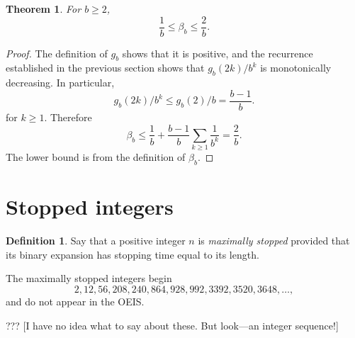 \documentclass[12pt]{amsart}
\newtheorem{theorem}{Theorem}
\theoremstyle{definition}
\newtheorem{definition}{Definition}
\begin{document}
\begin{theorem}
    For $b \geq 2$,
    \begin{equation*}
        \frac{1}{b} \leq \beta_b \leq \frac{2}{b}.
    \end{equation*}
\end{theorem}

\begin{proof}
    The definition of $g_b$ shows that it is positive, and the recurrence
    established in the previous section shows that $g_b(2k) / b^k$ is
    monotonically decreasing. In particular,
    \begin{equation*}
        g_b(2k) / b^k \leq g_b(2) / b = \frac{b - 1}{b}.
    \end{equation*}
    for $k \geq 1$. Therefore
    \begin{equation*}
        \beta_b \leq \frac{1}{b} + \frac{b - 1}{b} \sum_{k \geq 1} \frac{1}{b^k}
        = \frac{2}{b}.
    \end{equation*}
    The lower bound is from the definition of $\beta_b$.
\end{proof}

\section{Stopped integers}
\label{sec:stopped_integers}

\begin{definition}
    Say that a positive integer $n$ is \emph{maximally stopped} provided that
    its binary expansion has stopping time equal to its length.
\end{definition}

The maximally stopped integers begin
\begin{equation*}
    2, 12, 56, 208, 240, 864, 928, 992, 3392, 3520, 3648, \dots,
\end{equation*}
and do not appear in the OEIS.

??? [I have no idea what to say about these. But look---an integer sequence!]
\end{document}
